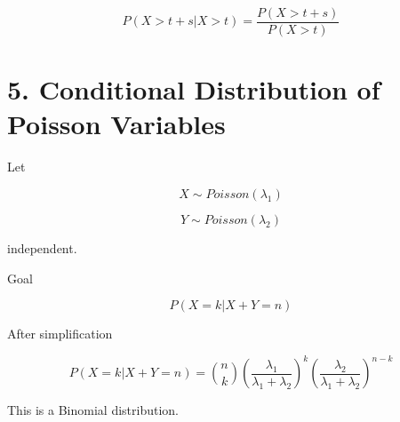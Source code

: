 \documentclass[12pt]{article}
\begin{document}
\[
P(X>t+s|X>t)=
\frac{P(X>t+s)}{P(X>t)}
\]

\section*{5. Conditional Distribution of Poisson Variables}

Let

\[
X\sim Poisson(\lambda_1)
\]

\[
Y\sim Poisson(\lambda_2)
\]

independent.

Goal

\[
P(X=k|X+Y=n)
\]

After simplification

\[
P(X=k|X+Y=n)
=
\binom{n}{k}
\left(\frac{\lambda_1}{\lambda_1+\lambda_2}\right)^k
\left(\frac{\lambda_2}{\lambda_1+\lambda_2}\right)^{n-k}
\]

This is a Binomial distribution.
\end{document}
